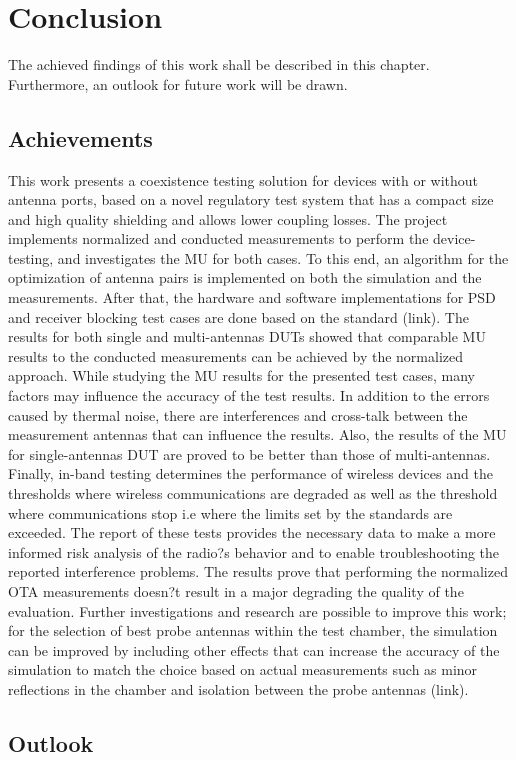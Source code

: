 \chapter{Conclusion} \label{chap:8}

The achieved findings of this work shall be described in this chapter. Furthermore, an outlook for future work will be drawn.

\section{Achievements}
This work presents a coexistence testing solution for devices with or without antenna ports, based on a novel regulatory test system that has a compact size and high quality shielding and allows lower coupling losses. The project implements normalized and conducted measurements to perform the device-testing, and investigates the MU for both cases. To this end, an algorithm for the optimization of antenna pairs is implemented on both the simulation and the measurements. After that, the hardware and software implementations for PSD and receiver blocking test cases are done based on the standard (link). The results for both single and multi-antennas DUTs showed that comparable MU results to the conducted measurements can be achieved by the normalized approach. While studying the MU results for the presented test cases, many factors may influence the accuracy of the test results. In addition to the errors caused by thermal noise, there are interferences and cross-talk between the measurement antennas that can influence the results. Also, the results of the MU for single-antennas DUT are proved to be better than those of multi-antennas. Finally, in-band testing determines the performance of wireless devices and the thresholds where wireless communications are degraded as well as the threshold where communications stop i.e where the limits set by the standards are exceeded. The report of these tests provides the necessary data to make a more informed risk analysis of the radio?s behavior and to enable troubleshooting the reported interference problems. The results prove that performing the normalized OTA measurements doesn?t result in a major degrading the quality of the evaluation.
Further investigations and research are possible to improve this work; for the selection of best probe antennas within the test chamber, the simulation can be improved by including other effects that can increase the accuracy of the simulation to match the choice based on actual measurements such as minor reflections in the chamber and isolation between the probe antennas (link).


\section{Outlook}


